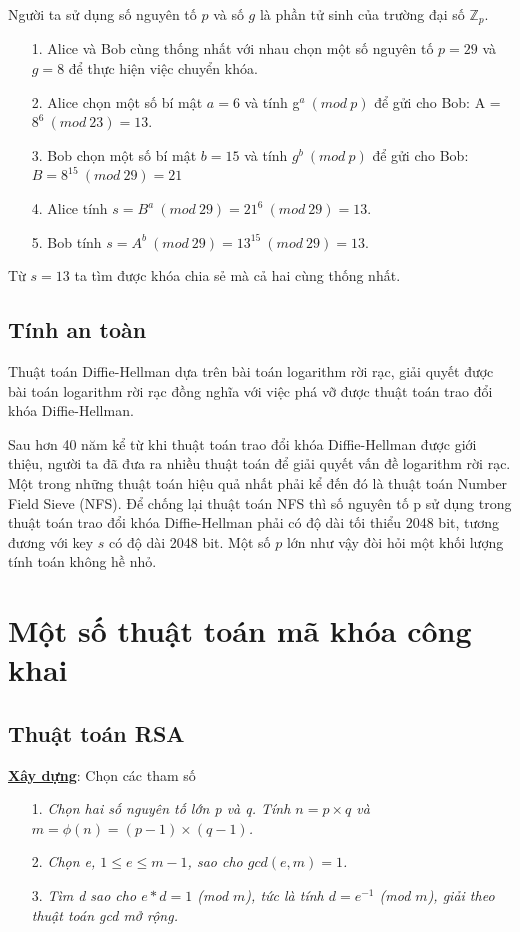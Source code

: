 \documentclass[a4paper,12pt]{report}
\begin{document}
Người ta sử dụng số nguyên tố $p$ và số $g$ là phần tử sinh của trường đại số $\mathbb{Z}_p$.
\begin{itemize}
\item[1. ] Alice và Bob cùng thống nhất với nhau chọn một số nguyên tố $p = 29$ và $g = 8$ để thực hiện việc chuyển khóa.
\item[2. ] Alice chọn một số bí mật $a = 6$ và tính g$^a \ (mod \ p)$ để gửi cho Bob: A = $8^6 \ (mod \ 23) = 13$.
\item[3. ] Bob chọn một số bí mật $b = 15$ và tính $g^b \ (mod \ p)$ để gửi cho Bob: $B = 8^15 \ (mod \ 29) = 21$
\item[4. ] Alice tính $s = B^a \ (mod \ 29) = 21^6 \ (mod \ 29) = 13$.
\item[5. ] Bob tính $s = A^b \ (mod \ 29) = 13^15 \ (mod \ 29) = 13$.
\end{itemize}
Từ $s = 13$ ta tìm được khóa chia sẻ mà cả hai cùng thống nhất.
\subsection*{Tính an toàn}
Thuật toán Diffie-Hellman dựa trên bài toán logarithm rời rạc, giải quyết được bài toán logarithm rời rạc đồng nghĩa với việc phá vỡ được thuật toán trao đổi khóa Diffie-Hellman.

Sau hơn 40 năm kể từ khi thuật toán trao đổi khóa Diffie-Hellman được giới thiệu, người ta đã đưa ra nhiều thuật toán để giải quyết vấn đề logarithm rời rạc. Một trong những thuật toán hiệu quả nhất phải kể đến đó là thuật toán Number Field Sieve (NFS). Để chống lại thuật toán NFS thì số nguyên tố p sử dụng trong thuật toán trao đổi khóa Diffie-Hellman phải có độ dài tối thiểu 2048 bit, tương đương với key $s$ có độ dài 2048 bit. Một số $p$ lớn như vậy đòi hỏi một khối lượng tính toán không hề nhỏ.
\section{Một số thuật toán mã khóa công khai}
\subsection*{Thuật toán RSA}
\textbf{\underline{Xây dựng}}: Chọn các tham số
\begin{itemize}
\item[1. ] \textit{Chọn hai số nguyên tố lớn p và q. Tính $n = p \times q$ và $m = \phi(n) = (p - 1) \times (q - 1)$.}
\item[2. ] \textit{Chọn e, $1 \leq e \leq m -1$, sao cho $gcd(e, m) = 1$.}
\item[3. ] \textit{Tìm d sao cho $e * d = 1$ (mod $m$), tức là tính $d = e^{-1}$
(mod $m$), giải theo thuật toán gcd mở rộng.}
\end{itemize}
\end{document}

